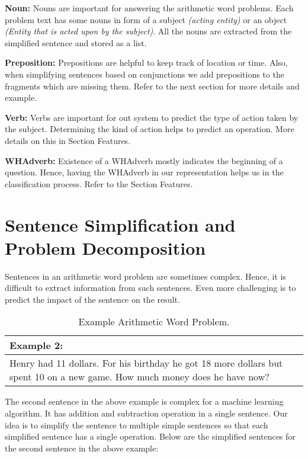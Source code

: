 \documentclass[11pt]{article}
\begin{document}
\textbf{Noun:} Nouns are important for answering the arithmetic word problems. Each problem text has some nouns in form of a subject \textit{(acting entity)} or an object \textit{(Entity that is acted upon by the subject)}. All the nouns are extracted from the simplified sentence and stored as a list. 
\vspace{4mm}

\textbf{Preposition:} Prepositions are helpful to keep track of location or time. Also, when simplifying sentences based on conjunctions we add prepositions to the fragments which are missing them. Refer to the next section for more details and example.
\vspace{4mm}

\textbf{Verb:} Verbs are important for out system to predict the type of action taken by the subject. Determining the kind of action helps to predict an operation. More details on this in Section Features.
\vspace{4mm}

\textbf{WHAdverb:} Existence of a WHAdverb mostly indicates the beginning of a question. Hence, having the WHAdverb in our representation helps us in the classification process. Refer to the Section Features.

\section{Sentence Simplification and Problem Decomposition}
Sentences in an arithmetic word problem are sometimes complex. Hence, it is difficult to extract information from such sentences. Even more challenging is to predict the impact of the sentence on the result. 

\begin{table}[h!]
\centering
\begin{tabular}{ | m{25em} | }
\hline
Example 2:\\
\hline
Henry had 11 dollars. For his birthday he got 18 more dollars but spent 10 on a new game. How much money does he have now?\\
\hline
\end{tabular}
\caption{Example Arithmetic Word Problem.}
\label{table:6}
\end{table}

The second sentence in the above example is complex for a machine learning algorithm. It has addition and subtraction operation in a single sentence. Our idea is to simplify the sentence to multiple simple sentences so that each simplified sentence has a single operation. Below are the simplified sentences for the second sentence in the above example:
\end{document}
